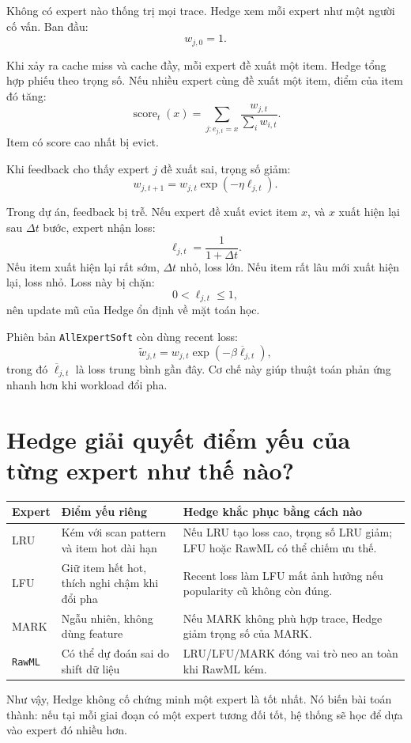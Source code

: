 \documentclass[11pt,a4paper]{article}
\newcommand{\code}[1]{\texttt{#1}}
\newcommand{\rawml}{\code{RawML}}
\begin{document}
Không có expert nào thống trị mọi trace. Hedge xem mỗi expert như một người cố vấn. Ban đầu:
\[
    w_{j,0}=1.
\]

Khi xảy ra cache miss và cache đầy, mỗi expert đề xuất một item. Hedge tổng hợp phiếu theo trọng số. Nếu nhiều expert cùng đề xuất một item, điểm của item đó tăng:
\[
    \operatorname{score}_t(x)
    =
    \sum_{j:e_{j,t}=x}
    \frac{w_{j,t}}{\sum_i w_{i,t}}.
\]
Item có score cao nhất bị evict.

Khi feedback cho thấy expert \(j\) đề xuất sai, trọng số giảm:
\[
    w_{j,t+1}
    =
    w_{j,t}\exp(-\eta \ell_{j,t}).
\]

Trong dự án, feedback bị trễ. Nếu expert đề xuất evict item \(x\), và \(x\) xuất hiện lại sau \(\Delta t\) bước, expert nhận loss:
\[
    \ell_{j,t}=\frac{1}{1+\Delta t}.
\]
Nếu item xuất hiện lại rất sớm, \(\Delta t\) nhỏ, loss lớn. Nếu item rất lâu mới xuất hiện lại, loss nhỏ. Loss này bị chặn:
\[
    0 < \ell_{j,t}\le 1,
\]
nên update mũ của Hedge ổn định về mặt toán học.

Phiên bản \code{AllExpertSoft} còn dùng recent loss:
\[
    \widetilde{w}_{j,t}
    =
    w_{j,t}\exp(-\beta\overline{\ell}_{j,t}),
\]
trong đó \(\overline{\ell}_{j,t}\) là loss trung bình gần đây. Cơ chế này giúp thuật toán phản ứng nhanh hơn khi workload đổi pha.

\section{Hedge giải quyết điểm yếu của từng expert như thế nào?}

\begin{tabularx}{\textwidth}{lXX}
\toprule
Expert & Điểm yếu riêng & Hedge khắc phục bằng cách nào \\
\midrule
LRU & Kém với scan pattern và item hot dài hạn & Nếu LRU tạo loss cao, trọng số LRU giảm; LFU hoặc RawML có thể chiếm ưu thế. \\
LFU & Giữ item hết hot, thích nghi chậm khi đổi pha & Recent loss làm LFU mất ảnh hưởng nếu popularity cũ không còn đúng. \\
MARK & Ngẫu nhiên, không dùng feature & Nếu MARK không phù hợp trace, Hedge giảm trọng số của MARK. \\
\rawml{} & Có thể dự đoán sai do shift dữ liệu & LRU/LFU/MARK đóng vai trò neo an toàn khi RawML kém. \\
\bottomrule
\end{tabularx}

Như vậy, Hedge không cố chứng minh một expert là tốt nhất. Nó biến bài toán thành: nếu tại mỗi giai đoạn có một expert tương đối tốt, hệ thống sẽ học để dựa vào expert đó nhiều hơn.
\end{document}
